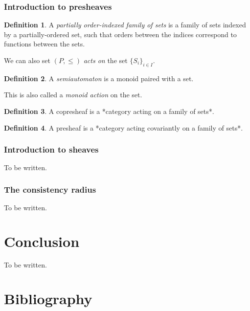 \documentclass[]             %
{NASA}                       %
\theoremstyle{definition}
\newtheorem{definition}{Definition}[section]
\begin{document}
\hypertarget{introduction-to-presheaves}{%
  \subsubsection{Introduction to
    presheaves}\label{introduction-to-presheaves}}

\begin{definition}
  A \emph{partially order-indexed family of sets} is a family of sets indexed by a partially-ordered set,
  such that orders between the indices correspond to functions between the sets.
\end{definition}

We can also set \((P, \leq)\) \emph{acts on} the set
\(\{S_i\}_{i \in I}\).

\begin{definition}
  A \emph{semiautomaton} is a monoid paired with a set.
\end{definition}

This is also called a \emph{monoid action} on the set.

\begin{definition}
  A copresheaf is a *category acting on a family of sets*.
\end{definition}

\begin{definition}
  A presheaf is a *category acting covariantly on a family of sets*.
\end{definition}

\hypertarget{introduction-to-sheaves}{%
  \subsubsection{Introduction to sheaves}\label{introduction-to-sheaves}}

To be written.

\hypertarget{the-consistency-radius}{%
  \subsubsection{The consistency radius}\label{the-consistency-radius}}

To be written.

\hypertarget{conclusion}{%
  \section{Conclusion}\label{conclusion}}

\label{sec:conclusion}

To be written.

\section*{Bibliography}\label{bibliography}



\end{document}
